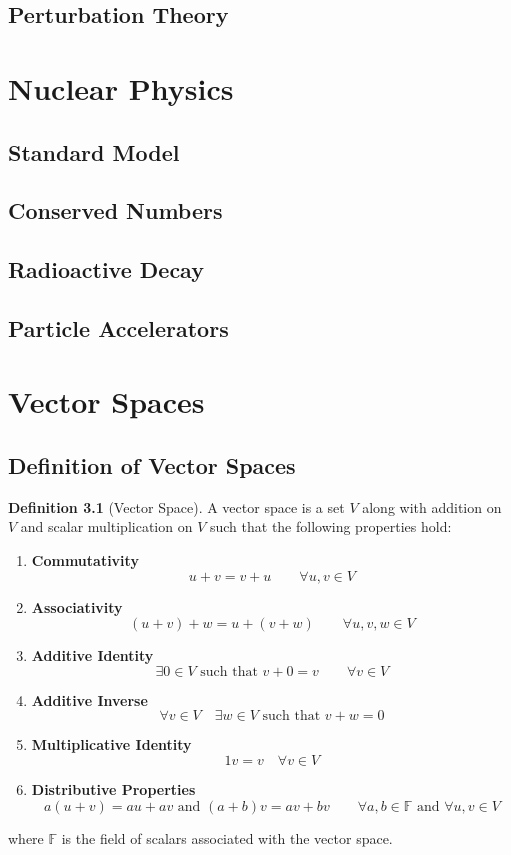 \documentclass[oneside]{book}
\numberwithin{figure}{section}
\numberwithin{equation}{section}
\theoremstyle{definition}
\newtheorem{definition}{Definition}[section]
\begin{document}
	\section{Perturbation Theory}

	\chapter{Nuclear Physics}
	\section{Standard Model}
	\section{Conserved Numbers}
	\section{Radioactive Decay}
	\section{Particle Accelerators}

	\appendix
	\chapter{Vector Spaces}
	\section{Definition of Vector Spaces}
	\begin{definition}[Vector Space]
		A vector space is a set $ V $ along with addition on $ V $ and scalar multiplication on $ V $ such that the following properties hold:
		\begin{enumerate}[label=\roman*.]
			\item \textbf{Commutativity}
			\[ u + v = v + u \qquad \forall u,v \in V \]
			
			\item \textbf{Associativity}
			\[ (u + v) + w = u + (v + w) \qquad \forall u,v,w \in V \]
			
			\item \textbf{Additive Identity}
			\[ \exists 0 \in V \text{ such that } v + 0 = v \qquad \forall v \in V \]
			
			\item \textbf{Additive Inverse}
			\[ \forall v \in V \quad \exists w \in V \text{ such that } v + w = 0  \]
			
			\item \textbf{Multiplicative Identity}
			\[ 1v = v \quad \forall v \in V \]
			
			\item \textbf{Distributive Properties}
			\[ a(u + v) = au + av \text{ and } (a + b)v = av + bv \qquad \forall a,b \in \mathbb{F} \text{ and } \forall u,v \in V \]
		\end{enumerate}
		where $ \mathbb{F} $ is the field of scalars associated with the vector space.
	\end{definition}
\end{document}
